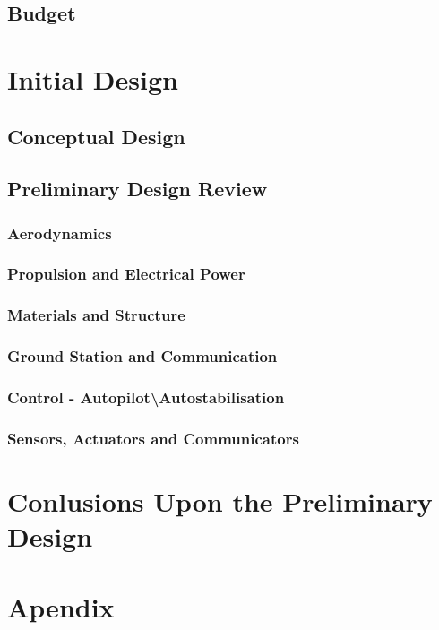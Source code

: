 \documentclass[12pt]{article}
\begin{document}
\newpage 

\begin{figure}[hp]
    \centering
    
\end{figure}

\newpage

\subsection{Budget}

\newpage

\section{Initial Design}

\subsection{Conceptual Design}

\newpage

\subsection{Preliminary Design Review}

\subsubsection{Aerodynamics}

\subsubsection{Propulsion and Electrical Power}

\subsubsection{Materials and Structure}

\subsubsection{Ground Station and Communication}

\subsubsection{Control - Autopilot\textbackslash Autostabilisation}

\subsubsection{Sensors, Actuators and Communicators}

\newpage

\section{Conlusions Upon the Preliminary Design}

\newpage

\appendix

\section{Apendix }
\end{document}
